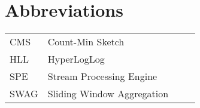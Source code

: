 \chapter*{Abbreviations}

\begin{flushleft}
\begin{tabular}{l p{0.8\linewidth}}
CMS      & Count-Min Sketch\\
HLL      & HyperLogLog\\
SPE      & Stream Processing Engine\\
SWAG     & Sliding Window Aggregation\\
\end{tabular}
\end{flushleft}

